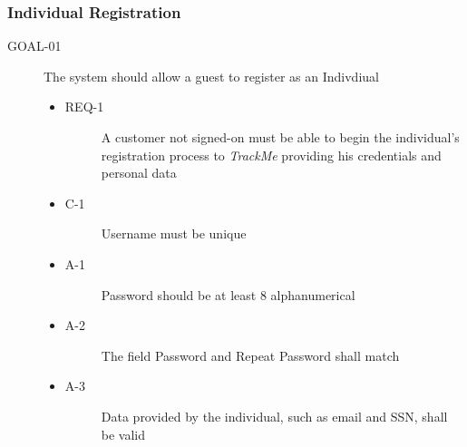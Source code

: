 \documentclass[a4paper]{article}
\newcommand{\requirement}{\ding{229}}%
\begin{document}
        \subsubsection{Individual Registration}
		\begin{description}
        	\item[GOAL-01] The system should allow a guest to register as an Indivdiual 
 \begin{itemize}
            	    \item[\requirement]
                	\begin{description}
                	\item[REQ-1] A customer not signed-on must be able to begin the individual's registration process to \textit{TrackMe} providing his credentials and personal data
                	\end{description}
                	\item
                	\begin{description}
                	\item[C-1] Username must be unique
                	\end{description}
                	\item
                	\begin{description}
                	\item[A-1] Password should be at least 8 alphanumerical
                	\end{description}
                	\item
                	\begin{description}
                	\item[A-2] The field Password and Repeat Password shall match
                	\end{description}
            	    \item
                	\begin{description}
                	\item[A-3] Data provided by the individual, such as email and SSN, shall be valid
                	\end{description}
                	\end{itemize}
        \end{description} 
        
\end{document}
